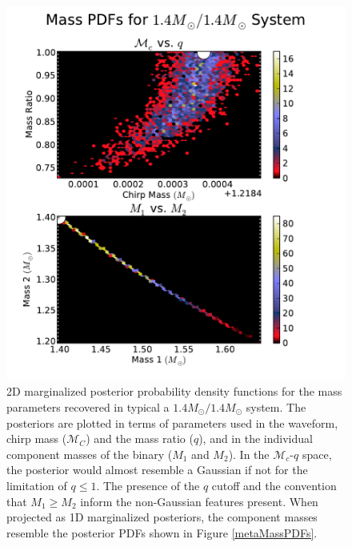 \documentclass[11pt,a4paper]{emulateapj} 
\newcommand{\chmass}{\mathcal{M}_c}
\begin{document}
\begin{figure}[h!]
  \centering \includegraphics[trim=1cm 0cm 2cm 0cm,
    clip=false,scale=0.63]{1414masses2D.pdf}
 \caption{2D marginalized posterior probability density functions for
   the mass parameters recovered in typical a
   $1.4M_{\odot}/1.4M_{\odot}$ system.  The posteriors are plotted in
   terms of parameters used in the waveform, chirp mass
   ($\mathcal{M}_C$) and the mass ratio ($q$), and in the individual
   component masses of the binary ($M_1$ and $M_2$).  In the
   $\chmass$-$q$ space, the posterior would almost resemble a Gaussian if not
   for the limitation of $q \leq 1$.  The presence of the $q$ cutoff
   and the convention that $M_1 \geq M_2$ inform the non-Gaussian
   features present.  When projected as 1D marginalized posteriors,
   the component masses resemble the posterior PDFs shown in Figure
   \ref{metaMassPDFs}.}
  \label{1414masses}
\end{figure}
\end{document}
